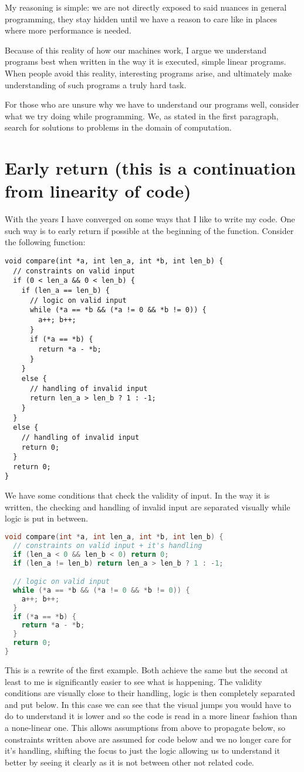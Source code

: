 \documentclass[a4paper]{article}
\begin{document}
My reasoning is simple: we are not directly exposed to said nuances in general programming, they stay hidden until we have a reason to care like in places where more performance is needed.

Because of this reality of how our machines work, I argue we understand programs best when written in the way it is executed, simple linear programs. When people avoid this reality, interesting programs arise, and ultimately make understanding of such programs a truly hard task.

For those who are unsure why we have to understand our programs well, consider what we try doing while programming. We, as stated in the first paragraph, search for solutions to problems in the domain of computation. 


\section{Early return (this is a continuation from linearity of code)}
With the years I have converged on some ways that I like to write my code. One such way is to early return if possible at the beginning of the function. Consider the following function:

\begin{lstlisting}
void compare(int *a, int len_a, int *b, int len_b) { 
  // constraints on valid input
  if (0 < len_a && 0 < len_b) {
    if (len_a == len_b) {
      // logic on valid input
      while (*a == *b && (*a != 0 && *b != 0)) { 
        a++; b++;
      }
      if (*a == *b) { 
        return *a - *b;
      }
    }
    else {
      // handling of invalid input
      return len_a > len_b ? 1 : -1; 
    }
  }
  else { 
    // handling of invalid input
    return 0; 
  }
  return 0;
}   
\end{lstlisting}

We have some conditions that check the validity of input. In the way it is written, the checking and handling of invalid input are separated visually while logic is put in between. 

\begin{lstlisting}[language=c++]
void compare(int *a, int len_a, int *b, int len_b) { 
  // constraints on valid input + it's handling
  if (len_a < 0 && len_b < 0) return 0;
  if (len_a != len_b) return len_a > len_b ? 1 : -1;

  // logic on valid input
  while (*a == *b && (*a != 0 && *b != 0)) { 
    a++; b++;
  }
  if (*a == *b) { 
    return *a - *b;
  }
  return 0;
}
\end{lstlisting}

This is a rewrite of the first example. Both achieve the same but the second at least to me is significantly easier to see what is happening. The validity conditions are visually close to their handling, logic is then completely separated and put below. In this case we can see that the visual jumps you would have to do to understand it is lower and so the code is read in a more linear fashion than a none-linear one. This allows assumptions from above to propagate below, so constraints written above are assumed for code below and we no longer care for it's handling, shifting the focus to just the logic allowing us to understand it better by seeing it clearly as it is not between other not related code. 
\end{document}
